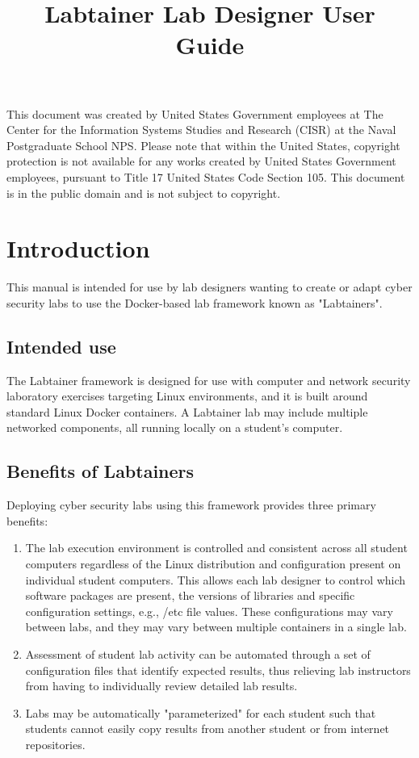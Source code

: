 \documentclass[12pt]{article}
\begin{document}
\begin{titlepage}
\title {Labtainer Lab Designer User Guide}
\maketitle

\vspace{2.0in}
This document was created by United States Government employees at 
The Center for the Information Systems Studies and Research (CISR) at the Naval Postgraduate School NPS. 
Please note that within the United States, copyright protection is not available for any works created  
by United States Government employees, pursuant to Title 17 United States Code Section 105.   
This document is in the public domain and is not subject to copyright. 
\end{titlepage}
\tableofcontents
\newpage
\section {Introduction}
This manual is intended for use by lab designers wanting
to create or adapt cyber security labs to use the Docker-based lab framework known
as "Labtainers".

\subsection{Intended use}
The Labtainer framework is designed for use with computer and network security
laboratory exercises targeting Linux environments, and it is built around 
standard Linux Docker containers.  A Labtainer lab may include multiple 
networked components, all running locally on a student's computer.
\subsection {Benefits of Labtainers}

Deploying cyber security labs using this framework
provides three primary benefits:

\begin{enumerate}
\item The lab execution environment is controlled and consistent
across all student computers regardless of the Linux distribution
and configuration present on individual student computers.  
This allows each lab designer to control
which software packages are present, the versions of libraries and
specific configuration settings, e.g., /etc file values. These configurations
may vary between labs, and they may vary between multiple containers in
a single lab.

\item Assessment of student lab activity can be automated through a
set of configuration files that identify expected results, thus
relieving lab instructors from having to individually review detailed lab
results.

\item Labs may be automatically "parameterized" for each student such that
students cannot easily copy results from another student or from internet
repositories.  
\end{enumerate}
\end{document}
